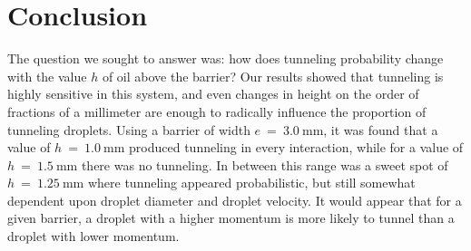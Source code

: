\chapter*{Conclusion}
	\setcounter{chapter}{4}
	\setcounter{section}{0}
	


The question we sought to answer was: how does tunneling probability change with the value $h$ of oil above the barrier? Our results showed that tunneling is highly sensitive in this system, and even changes in height on the order of fractions of a millimeter are enough to radically influence the proportion of tunneling droplets. Using a barrier of width $e~=~3.0~\mathrm{mm}$, it was found that a value of $h~=~1.0~\mathrm{mm}$ produced tunneling in every interaction, while for a value of $h~=~1.5~\mathrm{mm}$ there was no tunneling. In between this range was a sweet spot of $h~=~1.25~\mathrm{mm}$ where tunneling appeared probabilistic, but still somewhat dependent upon droplet diameter and droplet velocity. It would appear that for a given barrier, a droplet with a higher momentum is more likely to tunnel than a droplet with lower momentum.


